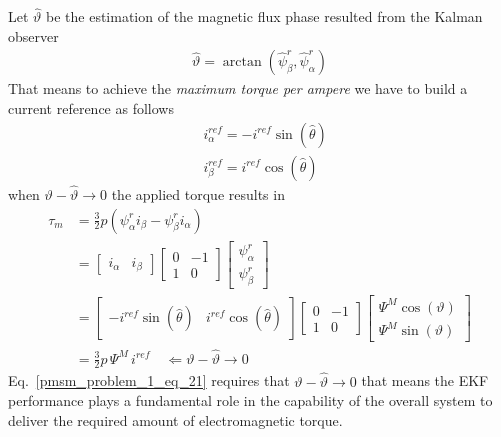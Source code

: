 \documentclass[12pt,a4paper,oneside]{book}
\begin{document}
\begin{onehalfspace}
Let $\hat{\vartheta}$ be the estimation of the magnetic flux phase resulted 
from the Kalman observer 
\begin{equation}\label{pmsm_problem_1_eq_19}
	\begin{aligned}
		\hat{\vartheta} = 
		\arctan\left(\hat{\psi}^r_{\beta},\hat{\psi}^r_{\alpha} \right)  
	\end{aligned} 
\end{equation}
That means to achieve the \textit{maximum torque per ampere} we have to build a 
current reference as follows 
\begin{equation}\label{pmsm_problem_1_eq_20}
	\begin{aligned}
		&i_{\alpha}^{ref} = -i^{ref}\sin(\hat{\theta})  \\[6pt]
		&i_{\beta}^{ref} = i^{ref}\cos(\hat{\theta})
	\end{aligned} 
\end{equation}
when $\vartheta - \hat{\vartheta} \rightarrow 0$ the applied torque results in
\begin{equation}\label{pmsm_problem_1_eq_21}
	\begin{aligned}
		\tau_m &= \frac{3}{2}p\left( 
		\psi^r_{\alpha}i_{\beta}-\psi^r_{\beta}i_{\alpha}\right) \\[6pt]
		&= \begin{bmatrix}
			i_{\alpha} & i_{\beta}
		\end{bmatrix} \begin{bmatrix}
			0 & -1 \\[6pt] 1 & 0
		\end{bmatrix}\begin{bmatrix}
			\psi^r_{\alpha} \\[6pt] \psi^r_{\beta}
		\end{bmatrix}\\[6pt]
		&= \begin{bmatrix}
			-i^{ref}\sin(\hat{\theta}) & i^{ref}\cos(\hat{\theta})
		\end{bmatrix} \begin{bmatrix}
			0 & -1 \\[6pt] 1 & 0
		\end{bmatrix}\begin{bmatrix}
			\Psi^M\cos(\vartheta) \\[6pt] \Psi^M\sin(\vartheta)
		\end{bmatrix}\\[6pt]
		&= \frac{3}{2}p\,\Psi^M\,i^{ref} \quad\Leftarrow\vartheta - \hat{\vartheta} \rightarrow 0
	\end{aligned}
\end{equation}
Eq.~\eqref{pmsm_problem_1_eq_21} requires that $\vartheta - \hat{\vartheta} \rightarrow 0$ that means the EKF performance plays a fundamental role in the capability of the overall system to deliver the required amount of electromagnetic torque. 


\end{onehalfspace}
\end{document}
